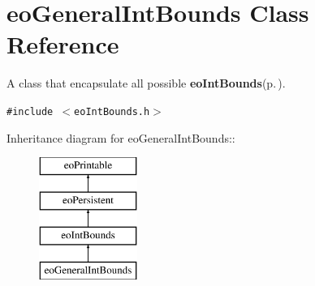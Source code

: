 \section{eo\-General\-Int\-Bounds Class Reference}
\label{classeo_general_int_bounds}
A class that encapsulate all possible {\bf eo\-Int\-Bounds}{\rm (p.\,\pageref{classeo_int_bounds})}.  


{\tt \#include $<$eo\-Int\-Bounds.h$>$}

Inheritance diagram for eo\-General\-Int\-Bounds::\begin{figure}[H]
\begin{center}
\leavevmode
\includegraphics[height=4cm]{classeo_general_int_bounds}
\end{center}
\end{figure}
